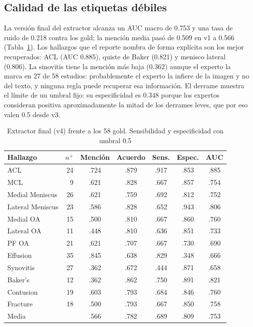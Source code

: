 \documentclass[conference]{IEEEtran}
\begin{document}
\subsection{Calidad de las etiquetas débiles}
\label{sec:res-etiquetas}

La versión final del extractor alcanza un AUC macro de 0.753 y una tasa de ruido de 0.218 contra los gold; la mención media pasó de 0.509 en v1 a 0.566 (Tabla~\ref{tab:ext-final}).
Los hallazgos que el reporte nombra de forma explícita son los mejor recuperados: ACL (AUC 0.885), quiste de Baker (0.821) y menisco lateral (0.806).
La sinovitis tiene la mención más baja (0.362) aunque el experto la marca en 27 de 58 estudios: probablemente el experto la infiere de la imagen y no del texto, y ninguna regla puede recuperar esa información.
El derrame muestra el límite de un umbral fijo: su especificidad es 0.348 porque los expertos consideran positiva aproximadamente la mitad de los derrames leves, que por eso valen 0.5 desde v3.

\begin{table}[t]
  \caption{Extractor final (v4) frente a los 58 gold. Sensibilidad y especificidad con umbral 0.5}
  \label{tab:ext-final}
  \centering
  \footnotesize
  \begin{tabular}{@{}lrccccc@{}}
    \toprule
    Hallazgo & $n^{+}$ & Mención & Acuerdo & Sens. & Espec. & AUC \\
    \midrule
    ACL              & 24 & .724 & .879 & .917 & .853 & .885 \\
    MCL              &  9 & .621 & .828 & .667 & .857 & .754 \\
    Medial Meniscus  & 26 & .621 & .759 & .692 & .812 & .752 \\
    Lateral Meniscus & 23 & .586 & .828 & .652 & .943 & .806 \\
    Medial OA        & 15 & .500 & .810 & .667 & .860 & .760 \\
    Lateral OA       & 11 & .448 & .810 & .636 & .851 & .733 \\
    PF OA            & 21 & .621 & .707 & .667 & .730 & .690 \\
    Effusion         & 35 & .845 & .638 & .829 & .348 & .666 \\
    Synovitis        & 27 & .362 & .672 & .444 & .871 & .658 \\
    Baker's          & 12 & .362 & .862 & .750 & .891 & .821 \\
    Contusion        & 19 & .603 & .793 & .684 & .846 & .760 \\
    Fracture         & 18 & .500 & .793 & .667 & .850 & .758 \\
    \midrule
    Media            &    & .566 & .782 & .689 & .809 & .753 \\
    \bottomrule
  \end{tabular}
\end{table}
\end{document}

